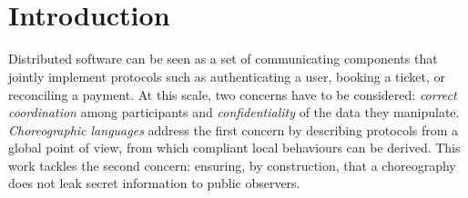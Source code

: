 \documentclass[12pt,a4paper,twoside]{book}
\begin{document}
\newpage~\newpage

\topmargin=-1cm

\tableofcontents
\thispagestyle{empty}

\newpage~\newpage

\raggedbottom
\chapter{Introduction} \label{chap:intro}
\pagestyle{plain}
\setcounter{page}{1}
Distributed software can be seen as a set of communicating components that jointly implement protocols such as authenticating a user, booking a ticket, or reconciling a payment. At this scale, two concerns have to be considered: \emph{correct coordination} among participants and \emph{confidentiality} of the data they manipulate. \emph{Choreographic languages} address the first concern by describing protocols from a global point of view, from which compliant local behaviours can be derived\cite{montesi2023introduction}. This work tackles the second concern: ensuring, by construction, that a choreography does not leak secret information to public observers.
\end{document}
